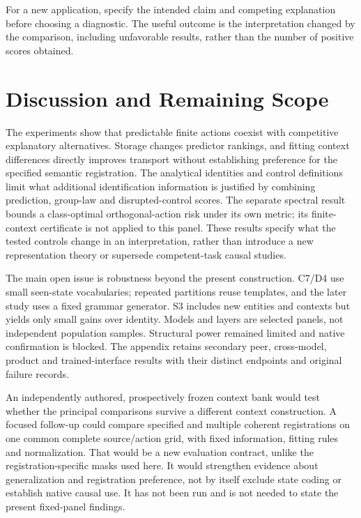 \documentclass{article}
\begin{document}
For a new application, specify the intended claim and competing explanation before choosing a diagnostic. The useful outcome is the interpretation changed by the comparison, including unfavorable results, rather than the number of positive scores obtained.

\section{Discussion and Remaining Scope}
The experiments show that predictable finite actions coexist with competitive explanatory alternatives. Storage changes predictor rankings, and fitting context differences directly improves transport without establishing preference for the specified semantic registration. The analytical identities and control definitions limit what additional identification information is justified by combining prediction, group-law and disrupted-control scores. The separate spectral result bounds a class-optimal orthogonal-action risk under its own metric; its finite-context certificate is not applied to this panel. These results specify what the tested controls change in an interpretation, rather than introduce a new representation theory or supersede competent-task causal studies.

The main open issue is robustness beyond the present construction. C7/D4 use small seen-state vocabularies; repeated partitions reuse templates, and the later study uses a fixed grammar generator. S3 includes new entities and contexts but yields only small gains over identity. Models and layers are selected panels, not independent population samples. Structural power remained limited and native confirmation is blocked. The appendix retains secondary peer, cross-model, product and trained-interface results with their distinct endpoints and original failure records.

An independently authored, prospectively frozen context bank would test whether the principal comparisons survive a different context construction. A focused follow-up could compare specified and multiple coherent registrations on one common complete source/action grid, with fixed information, fitting rules and normalization. That would be a new evaluation contract, unlike the registration-specific masks used here. It would strengthen evidence about generalization and registration preference, not by itself exclude state coding or establish native causal use. It has not been run and is not needed to state the present fixed-panel findings.
\end{document}
